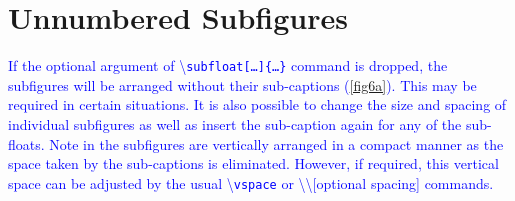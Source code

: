 \documentclass[phd]{ndsu-thesis-2022}
\newcommand\italk[1]{\textcolor{blue}{#1}}  %
\newcommand\cmd[1]{\textbackslash\texttt{#1}}  %
\begin{document}
\clearpage

\section{Unnumbered Subfigures}
\italk{If the optional argument of \cmd{subfloat[\ldots]\{\ldots\}} command is dropped, the subfigures will be arranged without their sub-captions (\cref{fig6a}). This may be required in certain situations. It is also possible to change the size and spacing of individual subfigures as well as insert the sub-caption again for any of the sub-floats. Note in \Cref{fig6a} the subfigures are vertically arranged in a compact manner as the space taken by the sub-captions is eliminated. However, if required, this vertical space can be adjusted by the usual \cmd{vspace} or \textbackslash\textbackslash [optional spacing] commands.  
}
\end{document}
